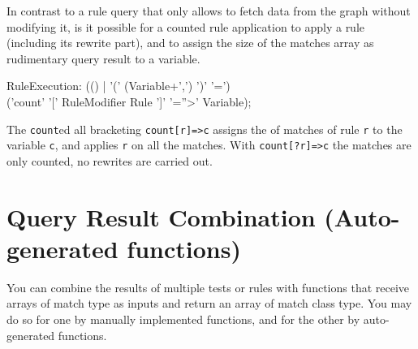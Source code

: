 In contrast to a rule query that only allows to fetch data from the graph without modifying it, is it possible for a counted rule application to apply a rule (including its rewrite part), and to assign the size of the matches array as rudimentary query result to a variable.

\begin{rail}
  RuleExecution: (() 
	| '(' (Variable+',') ')' '=') \\ ('count' '[' RuleModifier Rule ']' '=''>' Variable);
\end{rail}

The \texttt{count}ed all bracketing \texttt{count[r]=>c} assigns the  of matches of rule \texttt{r} to the variable \texttt{c}, and applies \texttt{r} on all the matches.
With \texttt{count[?r]=>c} the matches are only counted, no rewrites are carried out.


\section{Query Result Combination (Auto-generated functions)}

You can combine the results of multiple tests or rules with functions that receive arrays of match type as inputs and return an array of match class type.
You may do so for one by manually implemented functions, and for the other by auto-generated functions.

